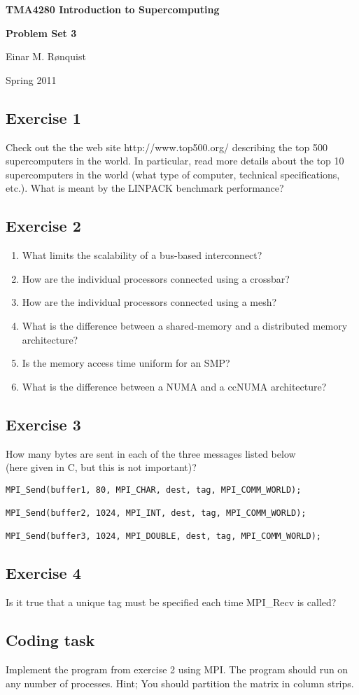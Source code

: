 \documentclass[11pt]{article}
\begin{document}
\centerline{\LARGE\textbf{TMA4280 Introduction to Supercomputing}}

\vspace*{5ex}

\centerline{\Large\textbf{Problem Set 3}}

\large

\vspace*{8ex}
\centerline{Einar M. R{\o}nquist}

\vspace*{4ex}
\centerline{Spring 2011}

\subsection*{Exercise 1}

Check out the the web site http://www.top500.org/  describing the 
top 500 supercomputers in the world. In particular, 
read more details about the top 10 supercomputers in the world
(what type of computer, technical
specifications, etc.). What is meant by the LINPACK
benchmark performance?

\subsection*{Exercise 2}

\begin{enumerate}
\item What limits the scalability of a bus-based interconnect?
\item How are the individual processors connected using a crossbar?
\item How are the individual processors connected using a mesh?
\item What is the difference between a shared-memory and a distributed 
memory architecture?
\item Is the memory access time uniform for an SMP?
\item What is the difference between a NUMA and a ccNUMA architecture?
\end{enumerate}

\subsection*{Exercise 3}

How many bytes are sent in each of the three messages listed below \\(here given in C, but this is not important)?
\begin{verbatim}
MPI_Send(buffer1, 80, MPI_CHAR, dest, tag, MPI_COMM_WORLD);

MPI_Send(buffer2, 1024, MPI_INT, dest, tag, MPI_COMM_WORLD);

MPI_Send(buffer3, 1024, MPI_DOUBLE, dest, tag, MPI_COMM_WORLD);

\end{verbatim}

\subsection*{Exercise 4}
Is it true that a unique tag must be specified each time MPI\_Recv is called?

\subsection*{Coding task}
Implement the program from exercise 2 using MPI.
The program should run on any number of processes.
Hint; You should partition the matrix in column strips. 
\end{document}
